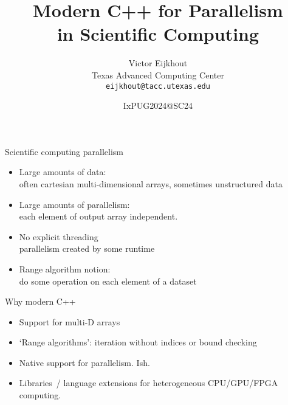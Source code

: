 \documentclass[10pt]{beamer}
\begin{document}


\author[Eijkhout]{Victor Eijkhout\\
  Texas Advanced Computing Center\\
  \texttt{eijkhout@tacc.utexas.edu}
}
\date{IxPUG2024@SC24}
\title[C++ Parallel]{Modern C++ for Parallelism\\ in Scientific Computing}
\maketitle

\begin{numberedframe}{Scientific computing parallelism}
  \begin{itemize}
  \item Large amounts of data: \\
    often cartesian multi-dimensional arrays, sometimes unstructured data
  \item Large amounts of parallelism:\\
    each element of output array independent.
  \item No explicit threading\\
    parallelism created by some runtime
  \item Range algorithm notion:\\
    do some operation on each element of a dataset
  \end{itemize}
\end{numberedframe}

\begin{numberedframe}{Why modern C++}
  \begin{itemize}
  \item Support for multi-D arrays
  \item `Range algorithms': iteration without indices or bound checking
  \item Native support for parallelism. Ish.
  \item Libraries~/ language extensions for heterogeneous CPU/GPU/FPGA computing.
  \end{itemize}
\end{numberedframe}

\end{document}
